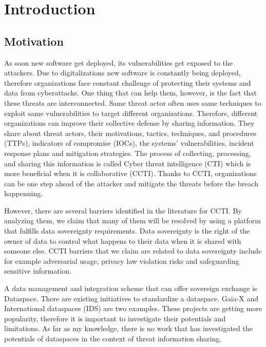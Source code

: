 \documentclass{article}
\begin{document}
\section{Introduction} %

\subsection{Motivation}



As soon new software get deployed, its vulnerabilities get exposed to the attackers. Due to digitalizations new software is constantly being deployed, therefore organizations face constant challenge of protecting their systems and data from cyberattacks. One thing that can help them, however, is the fact that these threats are interconnected. Same threat actor often uses same techniques to exploit same vulnerabilities to target different organizations. Therefore, different organizations can improve their collective defense by sharing information. They share about threat actors, their motivations, tactics, techniques, and procedures (TTPs), indicators of compromise (IOCs), the systems' vulnerabilities, incident response plans and mitigation strategies. The process of collecting, processing, and sharing this information is called Cyber threat intelligence (CTI) which is more beneficial when it is collaborative (CCTI). Thanks to CCTI, organizations can be one step ahead of the attacker and mitigate the threats before the breach happenning.


However, there are several barriers identified in the literature \cite{zibak_cyber_2019} for CCTI. %
By analyzing them, we claim that many of them will be resolved by using a platform that fulfills data sovereignty requirements. Data sovereignty is the right of the owner of data to control what happens to their data when it is shared with someone else.
CCTI barriers that we claim are related to data sovereignty include for example adversarial usage, privacy law violation risks and safeguarding sensitive information.


A data management and integration scheme that can offer sovereign exchange is Dataspace. There are existing initiatives to standardize a dataspace. Gaia-X and International dataspaces (IDS) are two examples. These projects are getting more popularity, therefore it is important to investigate their potentials and limitations. As far as my knowledge, there is no work that has investigated the potentials of dataspaces in the context of threat information sharing. 
\end{document}
